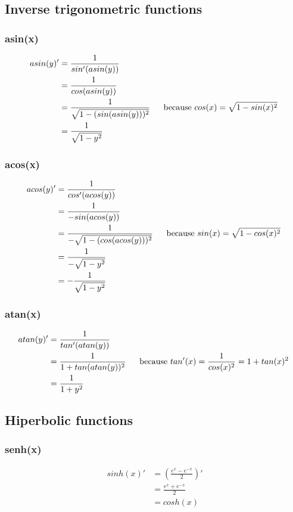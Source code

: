 \subsection{Inverse trigonometric functions}

\subsubsection{asin(x)}
\begin{align*}
asin(y)' &= \inv{ sin'(asin(y))}
\\&= \inv{ cos(asin(y))}
\\&= \inv{ \sqrt{1- (sin(asin(y)))^2}} \mathcomment{ because $cos(x) = \sqrt{1-sin(x)^2}$}
\\&= \inv{ \sqrt{1- y^2}}
\end{align*}

\subsubsection{acos(x)}

\begin{align*}
acos(y)' &= \inv{ cos'(acos(y))}
\\&= \inv{ -sin(acos(y))}
\\&= \inv{ -\sqrt{1- (cos(acos(y)))^2}} \mathcomment{ because $sin(x) = \sqrt{1-cos(x)^2}$}
\\&= \inv{ -\sqrt{1 - y^2}}
\\&= -\inv{\sqrt{1 - y^2}}
\end{align*}

\subsubsection{atan(x)}

\begin{align*}
atan(y)' &= \inv{ tan'(atan(y))}
\\&= \inv{ 1+tan(atan(y))^2} \mathcomment{ because $tan'(x) = \inv{cos(x)^2}= 1+tan(x)^2 $}
\\&=\inv{ 1+y^2}
\end{align*}


\subsection{Hiperbolic functions}



\subsubsection{senh(x)}
\begin{align*}
sinh(x)' &= (\frac{e^x-e^{-x}}{2})'
\\&= \frac{e^x+e^{-x}}{2}
\\&= cosh(x)
\end{align*}

